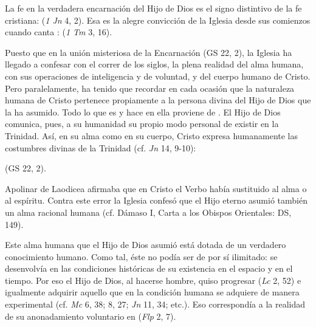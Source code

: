 	
	
	 La fe en la verdadera encarnación del Hijo de Dios es el signo distintivo de la fe cristiana:  (\emph{1 Jn} 4, 2). Esa es la alegre convicción de la Iglesia desde sus comienzos cuando canta :  (\emph{1 Tm} 3, 16).
	
	 Puesto que en la unión misteriosa de la Encarnación  (GS 22, 2), la Iglesia ha llegado a confesar con el correr de los siglos, la plena realidad del alma humana, con sus operaciones de inteligencia y de voluntad, y del cuerpo humano de Cristo. Pero paralelamente, ha tenido que recordar en cada ocasión que la naturaleza humana de Cristo pertenece propiamente a la persona divina del Hijo de Dios que la ha asumido. Todo lo que es y hace en ella proviene de . El Hijo de Dios comunica, pues, a su humanidad su propio modo personal de existir en la Trinidad. Así, en su alma como en su cuerpo, Cristo expresa humanamente las costumbres divinas de la Trinidad (cf. \emph{Jn} 14, 9-10):
	
	 (GS 22, 2).
	
	 Apolinar de Laodicea afirmaba que en Cristo el Verbo había sustituido al alma o al espíritu. Contra este error la Iglesia confesó que el Hijo eterno asumió también un alma racional humana (cf. Dámaso I, Carta a los Obispos Orientales: DS, 149).
	
	 Este alma humana que el Hijo de Dios asumió está dotada de un verdadero conocimiento humano. Como tal, éste no podía ser de por sí ilimitado: se desenvolvía en las condiciones históricas de su existencia en el espacio y en el tiempo. Por eso el Hijo de Dios, al hacerse hombre, quiso progresar  (\emph{Lc} 2, 52) e igualmente adquirir aquello que en la condición humana se adquiere de manera experimental (cf. \emph{Mc} 6, 38; 8, 27; \emph{Jn} 11, 34; etc.). Eso correspondía a la realidad de su anonadamiento voluntario en  (\emph{Flp} 2, 7).
	
